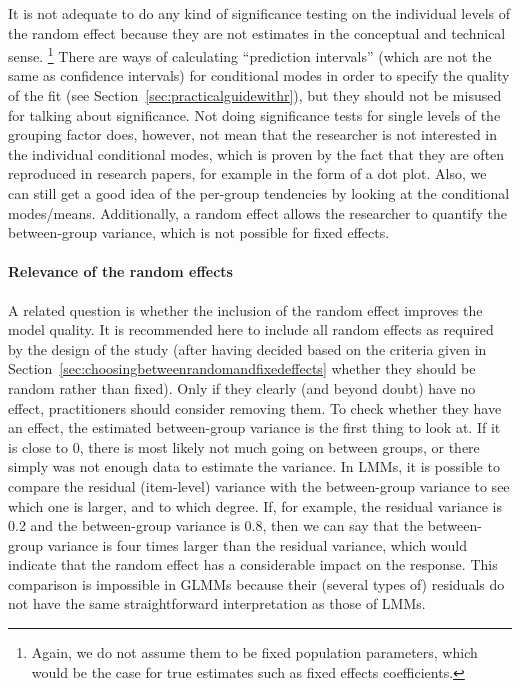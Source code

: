 It is not adequate to do any kind of significance testing on the individual levels of the random effect because they are not estimates in the conceptual and technical sense.%
\footnote{Again, we do not assume them to be fixed population parameters, which would be the case for true estimates such as fixed effects coefficients.}
There are ways of calculating ``prediction intervals'' (which are not the same as confidence intervals) for conditional modes in order to specify the quality of the fit (see Section~\ref{sec:practicalguidewithr}), but they should not be misused for talking about significance.
Not doing significance tests for single levels of the grouping factor does, however, not mean that the researcher is not interested in the individual conditional modes, which is proven by the fact that they are often reproduced in research papers, for example in the form of a dot plot.
Also, we can still get a good idea of the per-group tendencies by looking at the conditional modes\slash means.
Additionally, a random effect allows the researcher to quantify the between-group variance, which is not possible for fixed effects.

\paragraph{Relevance of the random effects}

A related question is whether the inclusion of the random effect improves the model quality.
It is recommended here to include all random effects as required by the design of the study (after having decided based on the criteria given in Section~\ref{sec:choosingbetweenrandomandfixedeffects} whether they should be random rather than fixed).
Only if they clearly (and beyond doubt) have no effect, practitioners should consider removing them.
To check whether they have an effect, the estimated between-group variance is the first thing to look at.
If it is close to $0$, there is most likely not much going on between groups, or there simply was not enough data to estimate the variance.
In LMMs, it is possible to compare the residual (item-level) variance with the between-group variance to see which one is larger, and to which degree.
If, for example, the residual variance is 0.2 and the between-group variance is 0.8, then we can say that the between-group variance is four times larger than the residual variance, which would indicate that the random effect has a considerable impact on the response.
This comparison is impossible in GLMMs because their (several types of) residuals do not have the same straightforward interpretation as those of LMMs.


